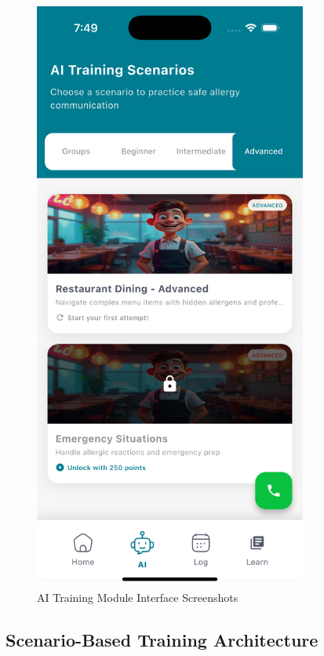 \documentclass[MScCS]{uccthesis}
\begin{document}
\begin{figure}[htbp]
\begin{minipage}[b]{0.45\textwidth}
        \includegraphics[width=0.8\textwidth,height=0.45\textheight,keepaspectratio]{Figures/ai_training_adv.png}
    \end{minipage}
     \caption{AI Training Module Interface Screenshots}
     \label{fig:ai-training-screenshots}
    
\end{figure}

\subsection{Scenario-Based Training Architecture}
\end{document}
